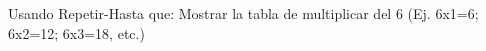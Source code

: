 ﻿
Usando Repetir-Hasta que: Mostrar la tabla de multiplicar del 6 (Ej. 6x1=6; 6x2=12; 6x3=18, etc.)


\newpage
{}

\volverindice
\newpage
